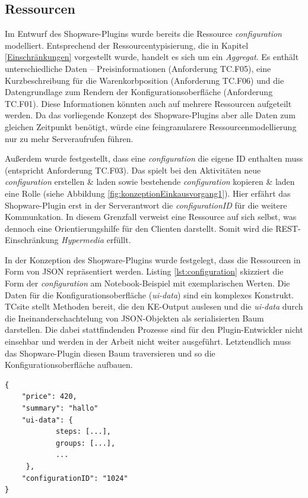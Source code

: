 \documentclass[11pt, a4paper, titlepage, listof=totoc, bibliography=totoc, index=totoc, twoside, openright, headings=normal]{scrreprt}
\begin{document}
\subsection{Ressourcen}
Im Entwurf des Shopware-Plugins wurde bereits die Ressource \emph{configuration} modelliert. Entsprechend der Ressourcentypisierung, die in Kapitel \ref{Einschränkungen} vorgestellt wurde, handelt es sich um ein \emph{Aggregat}. Es enthält unterschiedliche Daten -- Preisinformationen (Anforderung TC.F05), eine Kurzbeschreibung für die Warenkorbposition (Anforderung TC.F06) und die Datengrundlage zum Rendern der Konfigurationsoberfläche (Anforderung TC.F01). Diese Informationen könnten auch auf mehrere Ressourcen aufgeteilt werden. Da das vorliegende Konzept des Shopware-Plugins aber alle Daten zum gleichen Zeitpunkt benötigt, würde eine feingranularere Ressourcenmodellierung nur zu mehr Serveraufrufen führen.

Außerdem wurde festgestellt, dass eine \emph{configuration} die eigene ID enthalten muss (entspricht Anforderung TC.F03). Das spielt bei den Aktivitäten \glqq neue \emph{configuration} erstellen \& laden\grqq{}  sowie \glqq bestehende \emph{configuration} kopieren \& laden\grqq{} eine Rolle (siehe Abbildung \ref{fig:konzeptionEinkausvorgang1}). Hier erfährt das Shopware-Plugin erst in der Serverantwort die \emph{configurationID} für die weitere Kommunkation. In diesem Grenzfall verweist eine Ressource auf sich selbst, was dennoch eine Orientierungshilfe für den Clienten darstellt. Somit wird die REST-Einschränkung \emph{Hypermedia} erfüllt.

In der Konzeption des Shopware-Plugins wurde festgelegt, dass die Ressourcen in Form von JSON repräsentiert werden. Listing \ref{lst:configuration} skizziert die Form der \emph{configuration} am Notebook-Beispiel mit exemplarischen Werten. Die Daten für die Konfigurationsoberfläche (\emph{ui-data}) sind ein komplexes Konstrukt. TCsite stellt Methoden bereit, die den KE-Output auslesen und die \emph{ui-data} durch die Ineinanderschachtelung von JSON-Objekten als serialisierten Baum darstellen. Die dabei stattfindenden Prozesse sind für den Plugin-Entwickler nicht einsehbar und werden in der Arbeit nicht weiter ausgeführt. Letztendlich muss das Shopware-Plugin diesen Baum traversieren und so die Konfigurationsoberfläche aufbauen.

\vspace{1em}
\begin{lstlisting}[caption=Beispiel einer configuration, label=lst:configuration]
{
	"price": 420,
	"summary": "hallo"
	"ui-data": {
			steps: [...],
			groups: [...],
			...
	 },
	"configurationID": "1024"
}
\end{lstlisting}
\end{document}
